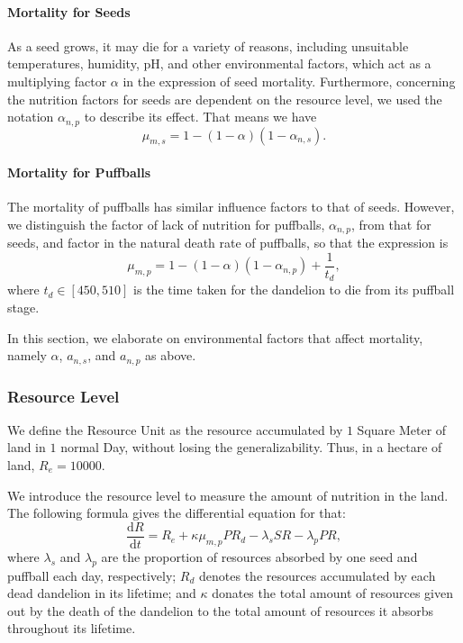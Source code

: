 \documentclass[12pt]{article}
\begin{document}
\paragraph{Mortality for Seeds}
As a seed grows, it may die for a variety of reasons, including unsuitable temperatures, humidity, pH, and other environmental factors, which act as a multiplying factor \(\alpha\) in the expression of seed mortality. Furthermore, concerning the nutrition factors for seeds are dependent on the resource level, we used the notation $\alpha_{n,p}$ to describe its effect. That means we have
\begin{equation}
    \mu_{m,s}=1-(1-\alpha)(1-\alpha_{n,s}).
\end{equation}

\paragraph{Mortality for Puffballs}
The mortality of puffballs has similar influence factors to that of seeds. However, we distinguish the factor of lack of nutrition for puffballs, \(\alpha_{n,p}\), from that for seeds, and factor in the natural death rate of puffballs, so that the expression is
\begin{equation}
    \mu_{m,p}=1-(1-\alpha)(1-\alpha_{n,p})+\frac{1}{t_d} ,
\end{equation}
where $t_d\in [450,510]$ is the time taken for the dandelion to die from its puffball stage.

In this section, we elaborate on environmental factors that affect mortality, namely \(\alpha\), $a_{n,s}$, and $a_{n,p}$ as above.

\subsubsection{Resource Level}
We define the Resource Unit as the resource accumulated by $1$ Square Meter of land in $1$ normal Day, without losing the generalizability. Thus, in a hectare of land, $R_e=10000$.

We introduce the resource level to measure the amount of nutrition in the land. The following formula gives the differential equation for that:
\begin{equation}
    \frac{\mathrm{d}R}{\mathrm{d}t}=R_e+\kappa \mu_{m,p}PR_d-\lambda_s SR-\lambda_p PR,
\end{equation}
where $\lambda_s$ and $\lambda_p$ are the proportion of resources absorbed by one seed and puffball each day, respectively; $R_d$ denotes the resources accumulated by each dead dandelion in its lifetime; and $\kappa$ donates the total amount of resources given out by the death of the dandelion to the total amount of resources it absorbs throughout its lifetime.
\end{document}
